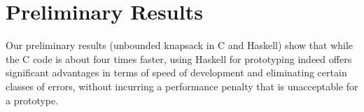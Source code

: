 \section{Preliminary Results}
Our preliminary results (unbounded knapsack in C and Haskell) show that while
the C code is about four times faster, using Haskell for prototyping indeed
offers significant advantages in terms of speed of development and eliminating
certain classes of errors, without incurring a performance penalty that is
unacceptable for a prototype.
